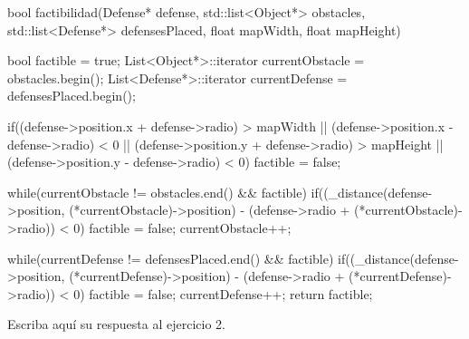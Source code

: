 bool factibilidad(Defense* defense, std::list<Object*> obstacles, std::list<Defense*> defensesPlaced, float mapWidth, float mapHeight){
    bool factible = true;
    List<Object*>::iterator currentObstacle = obstacles.begin();
    List<Defense*>::iterator currentDefense = defensesPlaced.begin();

    if((defense->position.x + defense->radio) > mapWidth || (defense->position.x - defense->radio) < 0 || (defense->position.y + defense->radio) > mapHeight || (defense->position.y - defense->radio) < 0){
        factible = false;
    }

    while(currentObstacle != obstacles.end() && factible){
        if((_distance(defense->position, (*currentObstacle)->position) - (defense->radio + (*currentObstacle)->radio)) < 0){
            factible = false;
        }
        currentObstacle++;
    }

    while(currentDefense != defensesPlaced.end() && factible){
        if((_distance(defense->position, (*currentDefense)->position) - (defense->radio + (*currentDefense)->radio)) < 0){
            factible = false;
        }
        currentDefense++;
    }
    return factible;
}Escriba aquí su respuesta al ejercicio 2.
